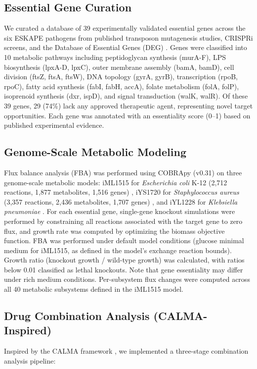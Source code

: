 \documentclass[12pt,a4paper]{article}
\begin{document}
\subsection{Essential Gene Curation}
We curated a database of 39 experimentally validated essential genes across the six ESKAPE pathogens from published transposon mutagenesis studies, CRISPRi screens, and the Database of Essential Genes (DEG) \citep{luo2014}. Genes were classified into 10 metabolic pathways including peptidoglycan synthesis (murA-F), LPS biosynthesis (lpxA-D, lpxC), outer membrane assembly (bamA, bamD), cell division (ftsZ, ftsA, ftsW), DNA topology (gyrA, gyrB), transcription (rpoB, rpoC), fatty acid synthesis (fabI, fabH, accA), folate metabolism (folA, folP), isoprenoid synthesis (dxr, ispD), and signal transduction (walK, walR). Of these 39 genes, 29 (74\%) lack any approved therapeutic agent, representing novel target opportunities. Each gene was annotated with an essentiality score (0--1) based on published experimental evidence.

\subsection{Genome-Scale Metabolic Modeling}
Flux balance analysis (FBA) was performed using COBRApy (v0.31) \citep{ebrahim2013} on three genome-scale metabolic models: iML1515 for \textit{Escherichia coli} K-12 (2,712 reactions, 1,877 metabolites, 1,516 genes) \citep{monk2017}, iYS1720 for \textit{Staphylococcus aureus} (3,357 reactions, 2,436 metabolites, 1,707 genes) \citep{seif2018}, and iYL1228 for \textit{Klebsiella pneumoniae} \citep{liao2011}. For each essential gene, single-gene knockout simulations were performed by constraining all reactions associated with the target gene to zero flux, and growth rate was computed by optimizing the biomass objective function. FBA was performed under default model conditions (glucose minimal medium for iML1515, as defined in the model's exchange reaction bounds). Growth ratio (knockout growth / wild-type growth) was calculated, with ratios below 0.01 classified as lethal knockouts. Note that gene essentiality may differ under rich medium conditions. Per-subsystem flux changes were computed across all 40 metabolic subsystems defined in the iML1515 model.

\subsection{Drug Combination Analysis (CALMA-Inspired)}
Inspired by the CALMA framework \citep{arora2026}, we implemented a three-stage combination analysis pipeline:
\end{document}
